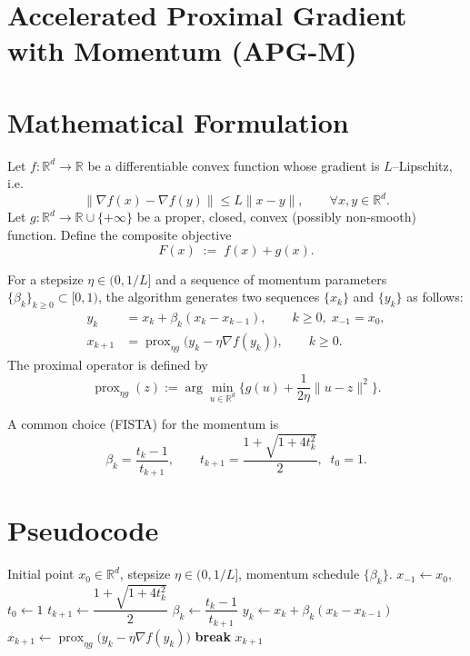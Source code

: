 \documentclass{article}
\newcommand{\prox}{\operatorname{prox}}
\newcommand{\R}{\mathbb{R}}
\begin{document}
\section*{Accelerated Proximal Gradient with Momentum (APG-M)}

\section*{Mathematical Formulation}
Let $f:\R^{d}\rightarrow\R$ be a differentiable convex function whose gradient is $L$–Lipschitz, i.e.
\[
\|\nabla f(x)-\nabla f(y)\|\le L\|x-y\|,\qquad\forall x,y\in\R^{d}.
\]
Let $g:\R^{d}\rightarrow\R\cup\{+\infty\}$ be a proper, closed, convex (possibly non‑smooth) function.  
Define the composite objective
\[
F(x)\;:=\;f(x)+g(x).
\]

For a stepsize $\eta\in(0,1/L]$ and a sequence of momentum parameters $\{\beta_k\}_{k\ge 0}\subset[0,1)$,
the algorithm generates two sequences $\{x_k\}$ and $\{y_k\}$ as follows:
\begin{align}
y_k &= x_k + \beta_k (x_k-x_{k-1}), \qquad k\ge 0,\; x_{-1}=x_0, \label{eq:y}\\
x_{k+1} &= \prox_{\eta g}\!\bigl(y_k-\eta\nabla f(y_k)\bigr), \qquad k\ge 0.\label{eq:x}
\end{align}
The proximal operator is defined by
\[
\prox_{\eta g}(z):=\arg\min_{u\in\R^{d}}\Big\{g(u)+\frac{1}{2\eta}\|u-z\|^{2}\Big\}.
\]

A common choice (FISTA) for the momentum is
\[
\beta_k = \frac{t_k-1}{t_{k+1}},\qquad 
t_{k+1}= \frac{1+\sqrt{1+4t_k^{2}}}{2},\;\;t_0=1.
\]

\section*{Pseudocode}
\begin{algorithm}[H]
\caption{Accelerated Proximal Gradient with Momentum (APG-M)}
\begin{algorithmic}[1]
\Require Initial point $x_0\in\R^{d}$, stepsize $\eta\in(0,1/L]$, momentum schedule $\{\beta_k\}$.
\State $x_{-1}\gets x_0$, $t_0\gets 1$
    \State $t_{k+1}\gets \dfrac{1+\sqrt{1+4t_k^{2}}}{2}$ 
    \State $\beta_k \gets \dfrac{t_k-1}{t_{k+1}}$
    \State $y_k \gets x_k + \beta_k (x_k - x_{k-1})$ \label{alg:y}
    \State $x_{k+1} \gets \prox_{\eta g}\!\bigl(y_k-\eta\nabla f(y_k)\bigr)$ \label{alg:x}
        \State \textbf{break}
    \EndIf
\EndFor
\State \Return $x_{k+1}$
\end{algorithmic}
\end{algorithm}
\end{document}

